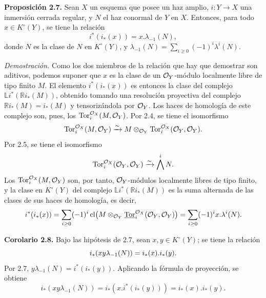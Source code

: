 \textbf{Proposición 2.7.} Sean \(X\) un esquema que posee un haz amplio, \(i:Y\to X\) una inmersión cerrada regular, y \(N\) el haz conormal de \(Y\) en \(X\). Entonces, para todo \(x\in K^\circ(Y)\), se tiene la relación
\begin{equation}\tag{2.7.1}
i^*(i_*(x))=x.\lambda_{-1}(N),
\end{equation}
donde \(N\) es la clase de \(N\) en \(K^\circ(Y)\), y \(\lambda_{-1}(N)=\sum_{i\ge0}(-1)^i\lambda^i(N)\).

\emph{Demostración.} Como los dos miembros de la relación que hay que demostrar son aditivos, podemos suponer que \(x\) es la clase de un \(\mathcal O_Y\)-módulo localmente libre de tipo finito \(M\). El elemento \(i^*(i_*(x))\) es entonces la clase del complejo \(\mathbb L i^*(\mathbb Ri_*(M))\), obtenido tomando una resolución proyectiva del complejo \(\mathbb Ri_*(M)=i_*(M)\) y tensorizándola por \(\mathcal O_Y\). Los haces de homología de este complejo son, pues, los \(\operatorname{Tor}_i^{\mathcal O_X}(M,\mathcal O_Y)\). Por 2.4, se tiene el isomorfismo
\[
\operatorname{Tor}_i^{\mathcal O_X}(M,\mathcal O_Y)
\xrightarrow{\sim}
M\otimes_{\mathcal O_Y}\operatorname{Tor}_i^{\mathcal O_X}(\mathcal O_Y,\mathcal O_Y).
\]
Por 2.5, se tiene el isomorfismo
\[
\operatorname{Tor}_i^{\mathcal O_X}(\mathcal O_Y,\mathcal O_Y)
\xrightarrow{\sim}
\bigwedge^i N.
\]
Los \(\operatorname{Tor}_i^{\mathcal O_X}(M,\mathcal O_Y)\) son, por tanto, \(\mathcal O_Y\)-módulos localmente libres de tipo finito, y la clase en \(K^\circ(Y)\) del complejo \(\mathbb L i^*(\mathbb Ri_*(M))\) es la suma alternada de las clases de sus haces de homología, es decir,
\[
i^*(i_*(x))=\sum_{i\ge0}(-1)^i
\operatorname{cl}\bigl(M\otimes_{\mathcal O_Y}\underline{\operatorname{Tor}}_i^{\mathcal O_X}(\mathcal O_Y,\mathcal O_Y)\bigr)
=\sum_{i\ge0}(-1)^i x.\lambda^i(N).
\]

\textbf{Corolario 2.8.} Bajo las hipótesis de 2.7, sean \(x,y\in K^\circ(Y)\); se tiene la relación
\begin{equation}\notag
i_*(xy\lambda_{-1}(N))=i_*(x).i_*(y).
\end{equation}
Por 2.7, \(y\lambda_{-1}(N)=i^*(i_*(y))\). Aplicando la fórmula de proyección, se obtiene
\[
i_*(xy\lambda_{-1}(N))
=i_*(x.i^*(i_*(y)))
=i_*(x).i_*(y).
\]
